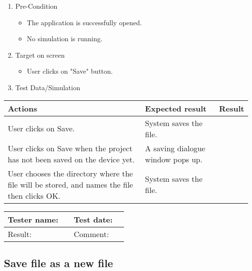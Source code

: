 \begin{enumerate}
	\item Pre-Condition
	\begin{itemize}
		\item The application is successfully opened.
		\item No simulation is running.
	\end{itemize}
	\item Target on screen
	\begin{itemize}
		\item User clicks on "Save" button.
	\end{itemize}
	\item Test Data/Simulation
\end{enumerate}
	\begin{tabularx}{\textwidth}{|X|X|p{2.5cm}|}\hline
		Actions & Expected result & Result \\\hline
		User clicks on Save. & System saves the file.  & \pass \\\hline 
		User clicks on Save when the project has not been saved on the device yet. & A saving dialogue window pops up. & \pass \\\hline
		User chooses the directory where the file will be stored, and names the file then clicks OK. & System saves the file. & \pass \\\hline 
	\end{tabularx}

\begin{tabularx}{\textwidth}{|p{3cm}X|p{3cm}X|}\hline
	Tester name: &  & Test date: & \\\hline
	Result: &  \pass & Comment: & \\\hline
\end{tabularx}

\newpage
\subsection{Save file as a new file}

